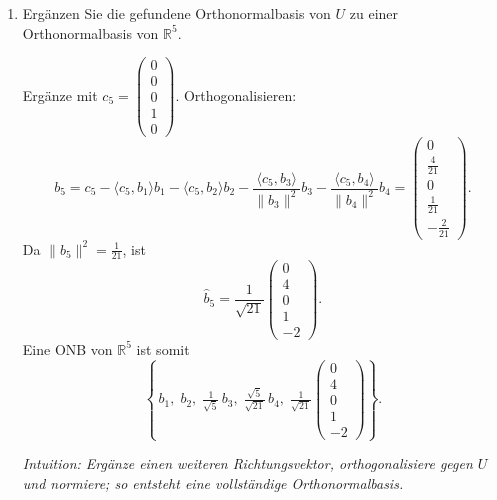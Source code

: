 \documentclass[11pt, a4paper]{article}
\begin{document}
\begin{enumerate}
  \item Ergänzen Sie die gefundene Orthonormalbasis von $U$ zu einer Orthonormalbasis von $\mathbb{R}^5$.
  \begin{framed}
  Ergänze mit $c_5=\begin{pmatrix}0\\0\\0\\1\\0\end{pmatrix}$. Orthogonalisieren:
  \[
  b_5=c_5-\langle c_5,b_1\rangle b_1-\langle c_5,b_2\rangle b_2
      -\frac{\langle c_5,b_3\rangle}{\|b_3\|^2}b_3
      -\frac{\langle c_5,b_4\rangle}{\|b_4\|^2}b_4
      =\begin{pmatrix}0\\\tfrac{4}{21}\\0\\\tfrac{1}{21}\\-\tfrac{2}{21}\end{pmatrix}.
  \]
  Da $\|b_5\|^2=\tfrac{1}{21}$, ist
  \[
   \widehat b_5=\frac{1}{\sqrt{21}}\begin{pmatrix}0\\4\\0\\1\\-2\end{pmatrix}.
  \]
  Eine ONB von $\mathbb{R}^5$ ist somit
  \[
  \left\{\, b_{1},\; b_{2},\; \tfrac{1}{\sqrt5}\,b_{3},\;
  \tfrac{\sqrt5}{\sqrt{21}}\,b_{4},\;
  \tfrac{1}{\sqrt{21}}\begin{pmatrix}0\\4\\0\\1\\-2\end{pmatrix}\right\}.
  \]

  \medskip\noindent\textit{Intuition: Ergänze einen weiteren Richtungsvektor, orthogonalisiere gegen $U$ und normiere; so entsteht eine vollständige Orthonormalbasis.}
  \end{framed}
\end{enumerate}
\end{document}
